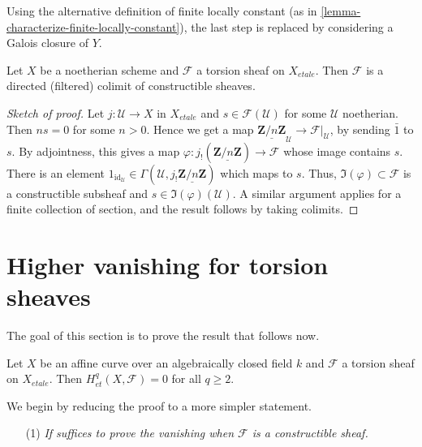 \begin{remark}
\label{remark-alternative}
Using the alternative definition of finite locally constant (as in
\ref{lemma-characterize-finite-locally-constant}), the last step is replaced
by considering a Galois closure of $Y$.
\end{remark}

\begin{lemma}
\label{lemma-torsion-colimit-constructible}
Let $X$ be a noetherian scheme and $\mathcal{F}$ a torsion sheaf on $X_{etale}$.
Then $\mathcal{F}$ is a directed (filtered) colimit of constructible sheaves.
\end{lemma}

\begin{proof}[Sketch of proof]
Let $j: \mathcal{U} \to X$ in $X_{etale}$ and $s\in \mathcal{F}(\mathcal{U})$ 
for
some $\mathcal{U}$ noetherian. Then $ns = 0$ for some $n>0$. Hence we get a map
$\underline{\mathbf{Z}/n\mathbf{Z}}_\mathcal{U}\to \mathcal{F}|_\mathcal{U}$,
by sending $\bar 1$ to $s$. By adjointness, this gives a map $\varphi:
j_!(\underline{\mathbf{Z}/n\mathbf{Z}}) \to \mathcal{F}$ whose image contains
$s$. There is an element $1_{\text{id}_\mathcal{U}} \in \Gamma(\mathcal{U},
j_!\underline{\mathbf{Z}/n\mathbf{Z}})$ which maps to $s$. Thus, $\Im(\varphi)
\subset \mathcal{F}$ is a constructible subsheaf and $s\in
\Im(\varphi)(\mathcal{U})$. A similar argument applies for a finite collection
of section, and the result follows by taking colimits.
\end{proof}




\section{Higher vanishing for torsion sheaves}
\label{section-vanishing-torsion}

\noindent
The goal of this section is to prove the result that follows now.

\begin{theorem}
\label{theorem-vanishing-affine-curves}
Let $X$ be an affine curve over an algebraically closed field $k$ and
$\mathcal{F}$ a torsion sheaf on $X_{etale}$. Then $H_{et}^q(X, \mathcal{F}) = 
0$
for all $q\geq 2$.
\end{theorem}

\noindent
We begin by reducing the proof to a more simpler statement.
\begin{enumerate}
\item[(1)] {\it If suffices to prove the vanishing when $\mathcal{F}$
is a constructible sheaf.}
\end{enumerate}

